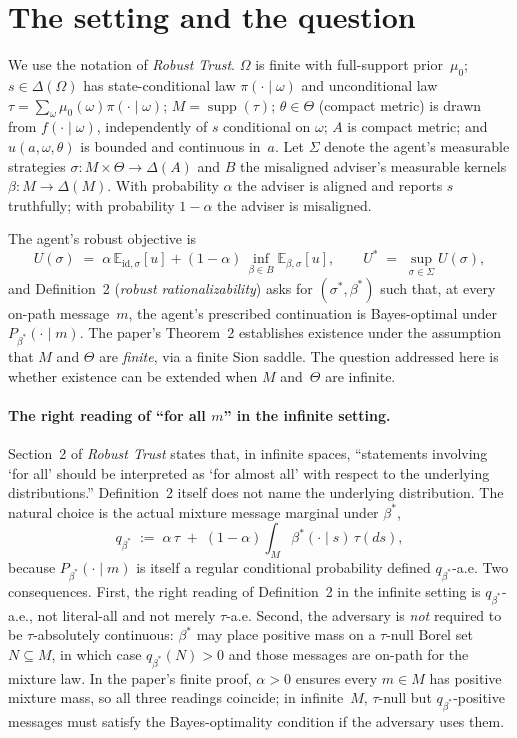 \documentclass[11pt]{article}
\theoremstyle{definition}
\theoremstyle{remark}
\newcommand{\Om}{\Omega}
\newcommand{\Th}{\Theta}
\newcommand{\Si}{\Sigma}
\newcommand{\suppset}{\operatorname{supp}}
\newcommand{\E}{\mathbb{E}}
\begin{document}
\section{The setting and the question}\label{sec:setting}

We use the notation of \emph{Robust Trust}. $\Om$ is finite with
full-support prior~$\mu_0$; $s\in\Delta(\Om)$ has state-conditional
law $\pi(\cdot\mid\omega)$ and unconditional law
$\tau = \sum_\omega \mu_0(\omega)\pi(\cdot\mid\omega)$;
$M = \suppset(\tau)$; $\theta\in\Th$ (compact metric) is drawn from
$f(\cdot\mid\omega)$, independently of $s$ conditional on $\omega$;
$A$ is compact metric; and $u(a,\omega,\theta)$ is bounded and
continuous in~$a$. Let $\Si$ denote the agent's measurable strategies
$\sigma:M\times\Th\to\Delta(A)$ and $B$ the misaligned adviser's
measurable kernels $\beta:M\to\Delta(M)$. With probability $\alpha$
the adviser is aligned and reports $s$ truthfully; with probability
$1-\alpha$ the adviser is misaligned.

The agent's robust objective is
\begin{equation}\label{eq:U}
  U(\sigma) \;=\; \alpha\,\E_{\mathrm{id},\sigma}[u] + (1-\alpha)\,\inf_{\beta\in B}\E_{\beta,\sigma}[u],
  \qquad U^* \;=\; \sup_{\sigma\in\Si} U(\sigma),
\end{equation}
and Definition~2 (\emph{robust rationalizability}) asks for
$(\sigma^*,\beta^*)$ such that, at every on-path message~$m$, the
agent's prescribed continuation is Bayes-optimal under
$P_{\beta^*}(\cdot\mid m)$. The paper's Theorem~2 establishes
existence under the assumption that $M$ and $\Th$ are \emph{finite},
via a finite Sion saddle. The question addressed here is whether
existence can be extended when $M$ and~$\Th$ are infinite.

\paragraph{The right reading of ``for all $m$'' in the infinite setting.}
Section~2 of \emph{Robust Trust} states that, in infinite spaces,
``statements involving `for all' should be interpreted as `for almost
all' with respect to the underlying distributions.'' Definition~2
itself does not name the underlying distribution. The natural choice
is the actual mixture message marginal under $\beta^*$,
\[
  q_{\beta^*} \;:=\; \alpha\,\tau \;+\; (1-\alpha)\!\int_M\!\beta^*(\cdot\mid s)\,\tau(ds),
\]
because $P_{\beta^*}(\cdot\mid m)$ is itself a regular conditional
probability defined $q_{\beta^*}$-a.e. Two consequences. First, the
right reading of Definition~2 in the infinite setting is
$q_{\beta^*}$-a.e., not literal-all and not merely $\tau$-a.e. Second,
the adversary is \emph{not} required to be $\tau$-absolutely
continuous: $\beta^*$ may place positive mass on a $\tau$-null Borel
set $N\subseteq M$, in which case $q_{\beta^*}(N)>0$ and those
messages are on-path for the mixture law. In the paper's finite
proof, $\alpha>0$ ensures every $m\in M$ has positive mixture mass,
so all three readings coincide; in infinite~$M$, $\tau$-null but
$q_{\beta^*}$-positive messages must satisfy the Bayes-optimality
condition if the adversary uses them.
\end{document}
